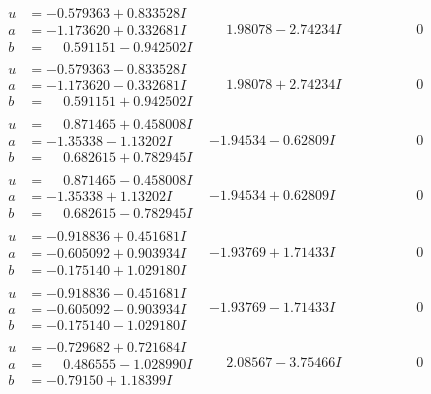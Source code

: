 \documentclass[1p]{elsarticle_modified}
\theoremstyle{definition}
\begin{document}
$$\begin{array}{c|c|c}
\begin{aligned}
u &= -0.579363 + 0.833528 I \\
a &= -1.173620 + 0.332681 I \\
b &= \phantom{-}0.591151 - 0.942502 I\end{aligned}
 & \phantom{-}1.98078 - 2.74234 I & \phantom{-0.000000 } 0 \\ \hline\begin{aligned}
u &= -0.579363 - 0.833528 I \\
a &= -1.173620 - 0.332681 I \\
b &= \phantom{-}0.591151 + 0.942502 I\end{aligned}
 & \phantom{-}1.98078 + 2.74234 I & \phantom{-0.000000 } 0 \\ \hline\begin{aligned}
u &= \phantom{-}0.871465 + 0.458008 I \\
a &= -1.35338 - 1.13202 I \\
b &= \phantom{-}0.682615 + 0.782945 I\end{aligned}
 & -1.94534 - 0.62809 I & \phantom{-0.000000 } 0 \\ \hline\begin{aligned}
u &= \phantom{-}0.871465 - 0.458008 I \\
a &= -1.35338 + 1.13202 I \\
b &= \phantom{-}0.682615 - 0.782945 I\end{aligned}
 & -1.94534 + 0.62809 I & \phantom{-0.000000 } 0 \\ \hline\begin{aligned}
u &= -0.918836 + 0.451681 I \\
a &= -0.605092 + 0.903934 I \\
b &= -0.175140 + 1.029180 I\end{aligned}
 & -1.93769 + 1.71433 I & \phantom{-0.000000 } 0 \\ \hline\begin{aligned}
u &= -0.918836 - 0.451681 I \\
a &= -0.605092 - 0.903934 I \\
b &= -0.175140 - 1.029180 I\end{aligned}
 & -1.93769 - 1.71433 I & \phantom{-0.000000 } 0 \\ \hline\begin{aligned}
u &= -0.729682 + 0.721684 I \\
a &= \phantom{-}0.486555 - 1.028990 I \\
b &= -0.79150 + 1.18399 I\end{aligned}
 & \phantom{-}2.08567 - 3.75466 I & \phantom{-0.000000 } 0 \\ \hline\begin{aligned}

\end{aligned}
\end{array}$$
\end{document}
